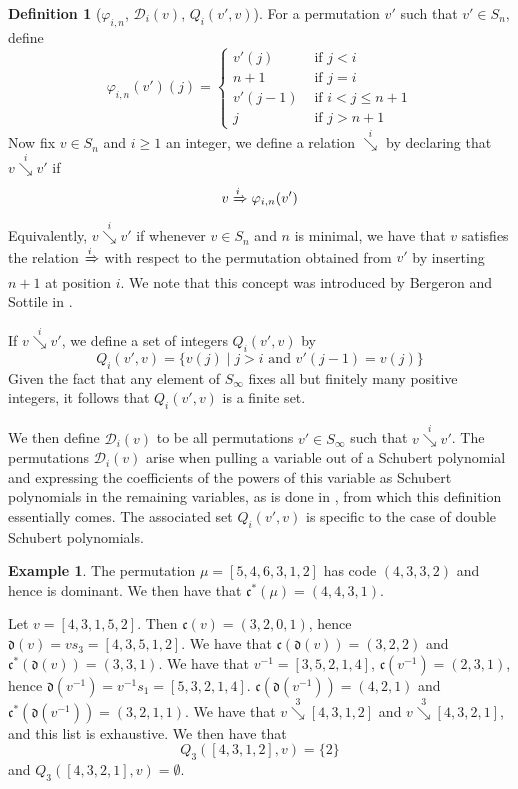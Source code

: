 \documentclass[reqno]{amsart}
\theoremstyle{definition}
\newtheorem{definition}[lemma]{Definition}
\newtheorem{example}[lemma]{Example}
\theoremstyle{remark}
\numberwithin{equation}{subsection}
\newcommand{\Tom}[1]{\xRightarrow{#1}}
\newcommand{\downvar}[1]{\stackrel{#1}{\searrow}}
\newcommand{\dom}{\mathfrak{d}}
\newcommand{\code}{\mathfrak{c}}
\begin{document}
	
	
	
	
	
	\begin{definition}[$\varphi_{i,n}$, $\mathcal{D}_i(v)$, $Q_i(v',v)$] \label{definition:polysequence}
		For a permutation $v'$ such that $v'\in S_{n}$, define
		$$\varphi_{i,n}(v')(j)=\begin{cases}
			v'(j)&\mbox{ if }j<i\\
			n+1&\mbox{ if }j=i\\
			v'(j-1)&\mbox{ if }i<j\leq n+1\\
			j&\mbox{ if }j>n+1
		\end{cases}$$
		Now fix $v\in S_n$ and $i\geq 1$ an integer, we define a relation $\downvar{i}$ by declaring that $v\downvar{i} v'$ if 
		$$v\Tom{i}\varphi_{i,n}(v')$$
		Equivalently, $v\downvar{i} v'$ if whenever $v\in S_n$ and $n$ is minimal, we have that $v$ satisfies the relation $\Tom{i}$ with respect to the permutation obtained from $v'$ by inserting $n+1$ at position $i$. We note that this concept was introduced by Bergeron and Sottile in \cite{bsskew}.
		
		If $v\downvar{i} v'$, we define a set of integers $Q_i(v',v)$ by
		$$Q_i(v',v)=\{v(j)\mid j>i\mbox{ and }v'(j-1)=v(j)\}$$
		Given the fact that any element of $S_\infty$ fixes all but finitely many positive integers, it follows that $Q_i(v',v)$ is a finite set.
		
		We then define $\mathcal{D}_i(v)$ to be all permutations $v'\in S_\infty$ such that $v\downvar{i} v'$. The permutations $\mathcal{D}_i(v)$ arise when pulling a variable out of a Schubert polynomial and expressing the coefficients of the powers of this variable as Schubert polynomials in the remaining variables, as is done in \cite{coprod}, from which this definition essentially comes. The associated set $Q_i(v',v)$ is specific to the case of double Schubert polynomials.
	\end{definition}
	
	
	
	\begin{example} 
		The permutation $\mu=[5,4,6,3,1,2]$ has code $(4,3,3,2)$ and hence is dominant. We then have that $\code^*(\mu)=(4,4,3,1)$.
		
		Let $v=[4,3,1,5,2]$. Then $\code(v)=(3,2,0,1)$, hence $\dom(v)=vs_3=[4,3,5,1,2]$. We have that $\code(\dom(v))=(3,2,2)$ and $\code^*(\dom(v))=(3,3,1)$. We have that $v^{-1}=[3,5,2,1,4]$, $\code(v^{-1})=(2,3,1)$, hence $\dom(v^{-1})=v^{-1}s_1=[5,3,2,1,4]$. $\code(\dom(v^{-1}))=(4,2,1)$ and $\code^*(\dom(v^{-1}))=(3,2,1,1)$. We have that $v\downvar{3}[4,3,1,2]$ and $v\downvar{3}[4,3,2,1]$, and this list is exhaustive.
		We then have that
		$$Q_3([4,3,1,2],v)=\{2\}$$
		and $Q_3([4,3,2,1],v)=\emptyset$.
	\end{example}
	
\end{document}
